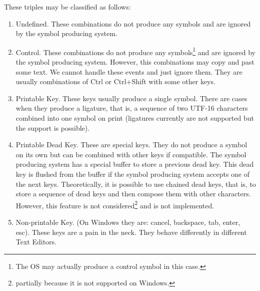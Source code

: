 \documentclass{article}
\begin{document}
These triples may be classified as follows:
\begin{enumerate}
\item Undefined. These combinations do not produce any symbols and are ignored by the symbol producing system.

\item Control. These combinations do not produce any symbols\footnote{The OS may actually produce a control symbol in this case.} and are ignored by the symbol producing system. However, this combinations may copy and past some text. We cannot handle these events and just ignore them. They are usually combinations of Ctrl or Ctrl+Shift with some other keys.

\item Printable Key. These keys usually produce a single symbol. There are cases when they produce a ligature, that is, a sequence of two UTF-16 characters combined into one symbol on print (ligatures currently are not supported but the support is possible).

\item Printable Dead Key. These are special keys. They do not produce a symbol on its own but can be combined with other keys if compatible. The symbol producing system has a special buffer to store a previous dead key. This dead key is flushed from the buffer if the symbol producing system accepts one of the next keys. Theoretically, it is possible to use chained dead keys, that is, to store a sequence of dead keys and then compose them with other characters. However, this feature is not considered\footnote{partially because it is not supported on Windows.} and is not implemented.

\item Non-printable Key. (On Windows they are: cancel, backspace, tab, enter, esc). These keys are a pain in the neck. They behave differently in different Text Editors.
\end{enumerate}
\end{document}
